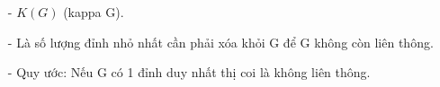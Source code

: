 \documentclass[12pt,oneside]{book}
\begin{document}
\begin{tcolorbox}[title=Số liên thông đỉnh]
\begin{itemize}
    \item[-] $K(G)$   (kappa G).
    \item[-] Là số lượng đỉnh nhỏ nhất cần phải xóa khỏi G để G không còn liên thông.
    \item[-] Quy ước: Nếu G có 1 đỉnh duy nhất thị coi là không liên thông.
    \begin{center}
        


\begin{tikzpicture}[x=0.75pt,y=0.75pt,yscale=-1,xscale=1]


\end{tikzpicture}
\end{center}
\end{itemize}
\end{tcolorbox}
\end{document}
